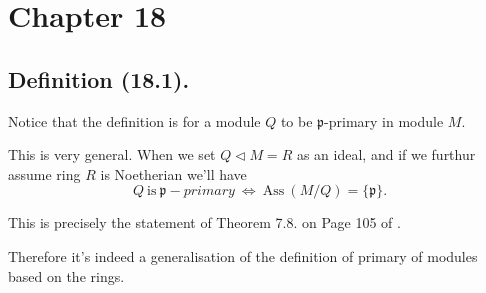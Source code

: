 \section{Chapter 18}

\subsection{Definition (18.1).}

Notice that the definition is for a module $Q$ to be $\mathfrak p$-primary in module $M$.

This is very general. When we set $Q\triangleleft M=R$ as an ideal, and if we furthur assume ring $R$ is Noetherian we'll have \[Q ~\text{is}~ \mathfrak p-primary ~\Leftrightarrow~ \text{Ass}~(M/Q)=\{\mathfrak p\}.\]

This is precisely the statement of Theorem 7.8. on Page 105 of \cite{reid1995undergraduate}.

Therefore it's indeed a generalisation of the definition of primary of modules based on the rings.